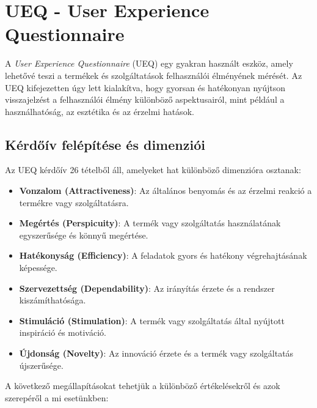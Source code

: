 \section{UEQ - User Experience Questionnaire}


A \textit{User Experience Questionnaire} (UEQ) egy gyakran használt eszköz, amely lehetővé teszi a termékek és szolgáltatások felhasználói élményének mérését. Az UEQ kifejezetten úgy lett kialakítva, hogy gyorsan és hatékonyan nyújtson visszajelzést a felhasználói élmény különböző aspektusairól, mint például a használhatóság, az esztétika és az érzelmi hatások.

\subsection{Kérdőív felépítése és dimenziói}

Az UEQ kérdőív 26 tételből áll, amelyeket hat különböző dimenzióra osztanak:

\begin{itemize}
    \item \textbf{Vonzalom (Attractiveness)}: Az általános benyomás és az érzelmi reakció a termékre vagy szolgáltatásra.
    \item \textbf{Megértés (Perspicuity)}: A termék vagy szolgáltatás használatának egyszerűsége és könnyű megértése.
    \item \textbf{Hatékonyság (Efficiency)}: A feladatok gyors és hatékony végrehajtásának képessége.
    \item \textbf{Szervezettség (Dependability)}: Az irányítás érzete és a rendszer kiszámíthatósága.
    \item \textbf{Stimuláció (Stimulation)}: A termék vagy szolgáltatás által nyújtott inspiráció és motiváció.
    \item \textbf{Újdonság (Novelty)}: Az innováció érzete és a termék vagy szolgáltatás újszerűsége.
\end{itemize}

A következő megállapításokat tehetjük a különböző értékelésekről és azok szerepéről a mi esetünkben:

